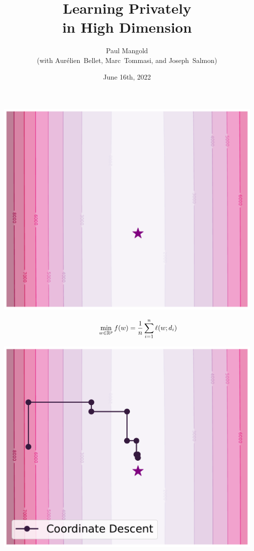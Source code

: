 \documentclass{beamer}
\title{\Huge Learning Privately\\ in High Dimension}
\author{
  Paul Mangold \\[1em]
 (with Aurélien~Bellet, Marc~Tommasi, and Joseph~Salmon)
}
\institute{\textsc{Magnet au Vert}}
\date{June 16th, 2022}
\begin{document}

\begin{notitle}
  \begin{frame}
    \titlepage
  \end{frame}
  \addtocounter{framenumber}{-1}
\end{notitle}

\hspace{-3.3em}
\begin{frame}
  \vspace{-5.2em}
  \includegraphics[width=1.17\textwidth]{example_none.pdf}

  \vspace{-18em}
  \begin{align*}
    \qquad \qquad ~ \min_{w\in\mathbb R^p} f(w)
    & = \frac 1n \sum_{i=1}^n \ell(w; d_i)
  \end{align*}
\end{frame}

\hspace{-3.3em}
\begin{frame}
  \vspace{-1.8em}
  \includegraphics[width=1.17\textwidth]{example_1_nopriv.pdf}
  \addtocounter{framenumber}{-1}
\end{frame}
\end{document}
